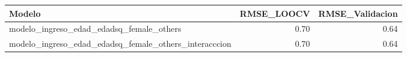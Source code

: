 \begin{table}[ht]
\centering
\begin{tabular}{lrr}
  \hline
Modelo & RMSE\_LOOCV & RMSE\_Validacion \\ 
  \hline
modelo\_ingreso\_edad\_edadsq\_female\_others & 0.70 & 0.64 \\ 
  modelo\_ingreso\_edad\_edadsq\_female\_others\_interacccion & 0.70 & 0.64 \\ 
   \hline
\end{tabular}
\end{table}
